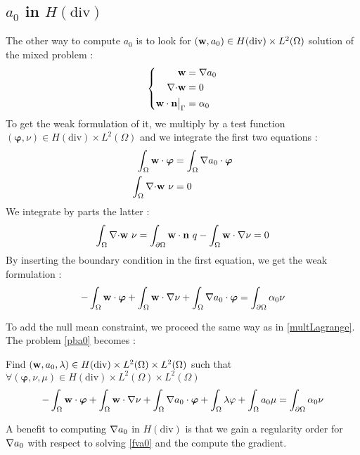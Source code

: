 \subsection{$a_0$ in $H(\mathrm{div})$}
The other way to compute $a_0$ is to look for $({\mathbf{w}}, a_0)\in H(\mathrm{div})\times L^2(\Omega)$ solution of the mixed problem :
\begin{equation*}
  \left\{
  \begin{aligned}
    {\mathbf{w}} &= {\nabla} a_0\\
    {\nabla\cdot} {\mathbf{w}} &= 0\\
    {\mathbf{w}}\cdot {\mathbf{n}}{\big\rvert_{\Gamma}} &= \alpha_0
  \end{aligned}
  \right.
\end{equation*}
To get the weak formulation of it, we multiply by a test function $(\bm{\varphi},\nu)\in H(\mathrm{div})\times L^2(\Omega)$ and we integrate the first two equations :
\begin{align*}
  \int_\Omega {\mathbf{w}}\cdot\bm{\varphi} &= \int_\Omega {\nabla} a_0\cdot\bm{\varphi}\\
  \int_\Omega {\nabla\cdot} {\mathbf{w}}\ \nu &= 0
\end{align*}
We integrate by parts the latter :
\[ \int_\Omega {\nabla\cdot} {\mathbf{w}}\ \nu = \int_{\partial\Omega} {\mathbf{w}}\cdot {\mathbf{n}}\ q - \int_\Omega {\mathbf{w}}\cdot{\nabla}\nu = 0  \]
By inserting the boundary condition in the first equation, we get the weak formulation :
\[ -\int_\Omega {\mathbf{w}}\cdot\bm{\varphi} + \int_\Omega {\mathbf{w}}\cdot{\nabla}\nu + \int_\Omega {\nabla} a_0\cdot\bm{\varphi}  = \int_{\partial\Omega} \alpha_0\nu \]

To add the null mean constraint, we proceed the same way as in \ref{multLagrange}. The problem \ref{pba0} becomes :
\begin{pb}\label{fva0div}
  Find $({\mathbf{w}}, a_0,\lambda)\in H(\mathrm{div})\times L^2(\Omega)\times L^2(\Omega)$ such that $\forall (\bm{\varphi},\nu,\mu)\in H(\mathrm{div})\times L^2(\Omega)\times L^2(\Omega)$
  \begin{equation*}
    -\int_\Omega {\mathbf{w}}\cdot\bm{\varphi} + \int_\Omega {\mathbf{w}}\cdot{\nabla}\nu + \int_\Omega {\nabla} a_0\cdot\bm{\varphi} + \int_\Omega \lambda\varphi + \int_\Omega  a_0\mu = \int_{\partial\Omega} \alpha_0\nu
  \end{equation*}
\end{pb}

\begin{rk}
  A benefit to computing ${\nabla} a_0$ in $H(\mathrm{div})$ is that we gain a regularity order for ${\nabla} a_0$ with respect to solving \ref{fva0} and the compute the gradient.
\end{rk}

